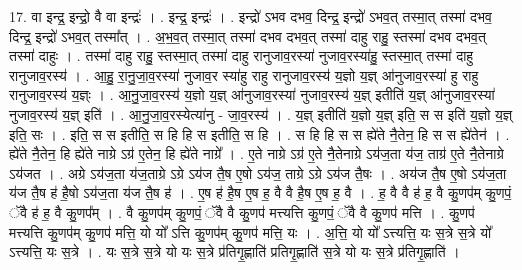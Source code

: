\documentclass[17pt]{extarticle}
\begin{document}
17. वा इन्द्र॒ इन्द्रो॒ वै वा इन्द्रः॑ । . इन्द्र॒ इन्द्रः॑ । . इन्द्रो॑ ऽभव दभव॒ दिन्द्र॒ इन्द्रो॑ ऽभव॒त् तस्मा॒त् तस्मा॑ दभव॒ दिन्द्र॒ इन्द्रो॑ ऽभव॒त् तस्मा᳚त् । . अ॒भ॒व॒त् तस्मा॒त् तस्मा॑ दभव दभव॒त् तस्मा॑ दाहु राहु॒ स्तस्मा॑ दभव दभव॒त् तस्मा॑ दाहुः । . तस्मा॑ दाहु राहु॒ स्तस्मा॒त् तस्मा॑ दाहु रानुजाव॒रस्या॑ नुजाव॒रस्या॑हु॒ स्तस्मा॒त् तस्मा॑ दाहु रानुजाव॒रस्य॑ । . आ॒हु॒ रा॒नु॒जा॒व॒रस्या॑ नुजाव॒र स्या॑हु राहु रानुजाव॒रस्य॑ य॒ज्ञो य॒ज्ञ् आ॑नुजाव॒रस्या॑ हु राहु रानुजाव॒रस्य॑ य॒ज्ञ्ः । . आ॒नु॒जा॒व॒रस्य॑ य॒ज्ञो य॒ज्ञ् आ॑नुजाव॒रस्या॑ नुजाव॒रस्य॑ य॒ज्ञ् इतीति॑ य॒ज्ञ् आ॑नुजाव॒रस्या॑ नुजाव॒रस्य॑ य॒ज्ञ् इति॑ । . आ॒नु॒जा॒व॒रस्येत्या॑नु - जा॒व॒रस्य॑ । . य॒ज्ञ् इतीति॑ य॒ज्ञो य॒ज्ञ् इति॒ स स इति॑ य॒ज्ञो य॒ज्ञ् इति॒ सः । . इति॒ स स इतीति॒ स हि हि स इतीति॒ स हि । . स हि हि स स ह्ये॑ते नै॒तेन॒ हि स स ह्ये॑तेन॑ । . ह्ये॑ते नै॒तेन॒ हि ह्ये॑ते नाग्रे ऽग्र॑ ए॒तेन॒ हि ह्ये॑ते नाग्रे᳚ । . ए॒ते नाग्रे ऽग्र॑ ए॒ते नै॒तेनाग्रे ऽय॑ज॒ता य॑ज॒ ताग्र॑ ए॒ते नै॒तेनाग्रे ऽय॑जत । . अग्रे ऽय॑ज॒ता य॑ज॒ताग्रे ऽग्रे ऽय॑ज तै॒ष ए॒षो ऽय॑ज॒ ताग्रे ऽग्रे ऽय॑ज तै॒षः । . अय॑ज तै॒ष ए॒षो ऽय॑ज॒ता य॑ज तै॒ष ह॑ है॒षो ऽय॑ज॒ता य॑ज तै॒ष ह॑ । . ए॒ष ह॑ है॒ष ए॒ष ह॒ वै वै है॒ष ए॒ष ह॒ वै । . ह॒ वै वै ह॑ ह॒ वै कु॒णप॑म् कु॒णपं॒ ॅवै ह॑ ह॒ वै कु॒णप᳚म् । . वै कु॒णप॑म् कु॒णपं॒ ॅवै वै कु॒णप॑ मत्त्यत्ति कु॒णपं॒ ॅवै वै कु॒णप॑ मत्ति । . कु॒णप॑ मत्त्यत्ति कु॒णप॑म् कु॒णप॑ मत्ति॒ यो यो᳚ ऽत्ति कु॒णप॑म् कु॒णप॑ मत्ति॒ यः । . अ॒त्ति॒ यो यो᳚ ऽत्त्यत्ति॒ यः स॒त्रे स॒त्रे यो᳚ ऽत्त्यत्ति॒ यः स॒त्रे । . यः स॒त्रे स॒त्रे यो यः स॒त्रे प्र॑तिगृ॒ह्णाति॑ प्रतिगृ॒ह्णाति॑ स॒त्रे यो यः स॒त्रे प्र॑तिगृ॒ह्णाति॑ । \newline
\end{document}
